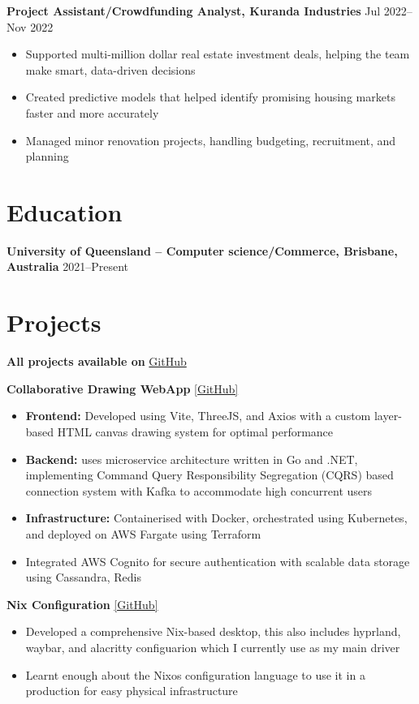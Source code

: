 \documentclass[10pt,a4paper]{article}
\begin{document}
	\textbf{Project Assistant/Crowdfunding Analyst, Kuranda Industries} \hfill Jul 2022--Nov 2022 
	\begin{itemize}[label=\textbullet, itemsep=0.05cm]
		\item Supported multi-million dollar real estate investment deals, helping the team make smart, data-driven decisions
		\item Created predictive models that helped identify promising housing markets faster and more accurately
		\item Managed minor renovation projects, handling budgeting, recruitment, and planning
	\end{itemize}
	
	\section{Education}
	\textbf{University of Queensland -- 		Computer science/Commerce, Brisbane, Australia} \hfill 2021--Present \\	
	\section{Projects}
	\textbf{All projects available on} \href{https://github.com/CameronBadman}{GitHub}
	
	\textbf{Collaborative Drawing WebApp} \href{https://github.com/CameronBadman/Canvis-collab-webapp}{[GitHub]}
	\begin{itemize}[label=\textbullet, itemsep=0.05cm]
		\item \textbf{Frontend:} Developed using Vite, ThreeJS, and Axios with a custom layer-based HTML canvas drawing system for optimal performance
		\item \textbf{Backend:} uses microservice architecture written in Go and .NET, implementing Command Query Responsibility Segregation (CQRS) based connection system with Kafka to accommodate high concurrent users
		\item \textbf{Infrastructure:} Containerised with Docker, orchestrated using Kubernetes, and deployed on AWS Fargate using Terraform
		\item Integrated AWS Cognito for secure authentication with scalable data storage using Cassandra, Redis
	\end{itemize}
	
	\textbf{Nix Configuration} \href{https://github.com/CameronBadman/nvim-config}{[GitHub]}
	\begin{itemize}[label=\textbullet, itemsep=0.05cm]
		\item Developed a comprehensive Nix-based desktop, this also includes hyprland, waybar, and alacritty configuarion which I currently use as my main driver
		\item Learnt enough about the Nixos configuration language to use it in a production for easy physical infrastructure
	\end{itemize}
	
\end{document}
